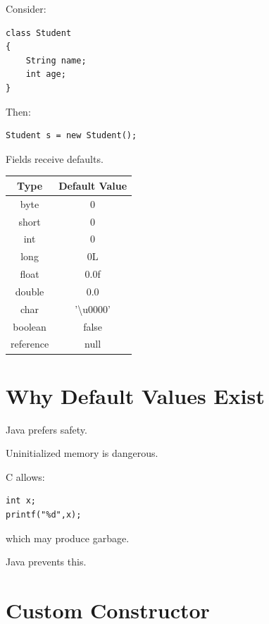 \documentclass[11pt,a4paper]{book}
\begin{document}
Consider:

\begin{verbatim}
class Student
{
    String name;
    int age;
}
\end{verbatim}

Then:

\begin{verbatim}
Student s = new Student();
\end{verbatim}

Fields receive defaults.


\begin{longtable}{|c|c|}
\hline
Type & Default Value \\
\hline
byte & 0 \\
short & 0 \\
int & 0 \\
long & 0L \\
float & 0.0f \\
double & 0.0 \\
char & '\textbackslash{}u0000' \\
boolean & false \\
reference & null \\
\hline
\end{longtable}


\section{Why Default Values Exist}

\begin{idea}

Java prefers safety.

Uninitialized memory is dangerous.

\end{idea}

C allows:

\begin{verbatim}
int x;
printf("%d",x);
\end{verbatim}

which may produce garbage.

Java prevents this.


\section{Custom Constructor}
\end{document}
